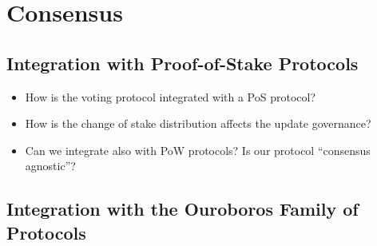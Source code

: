 \section{Consensus}
\subsection*{Integration with Proof-of-Stake Protocols}
\begin{itemize}
\item How is the voting protocol integrated with a PoS protocol?
\item How is the change of stake distribution affects the update governance?
\item Can we integrate also with PoW protocols? Is our protocol “consensus agnostic”?
\end{itemize}

\subsection*{Integration with the Ouroboros Family of Protocols}